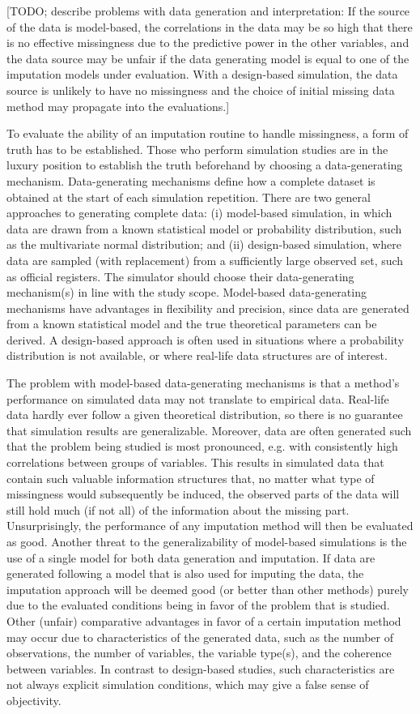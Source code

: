 \documentclass[bimj,fleqn]{w-art}
\begin{document}
[TODO; describe problems with data generation and interpretation: If the source of the data is model-based, the correlations in the data may be so high that there is no effective missingness due to the predictive power in the other variables, and the data source may be unfair if the data generating model is equal to one of the imputation models under evaluation. With a design-based simulation, the data source is unlikely to have no missingness and the choice of initial missing data method may propagate into the evaluations.]

To evaluate the ability of an imputation routine to handle missingness, a form of truth has to be established. Those who perform simulation studies are in the luxury position to establish the truth beforehand by choosing a data-generating mechanism. Data-generating mechanisms define how a complete dataset is obtained at the start of each simulation repetition. There are two general approaches to generating complete data: (i) model-based simulation, in which data are drawn from a known statistical model or probability distribution, such as the multivariate normal distribution; and (ii) design-based simulation, where data are sampled (with replacement) from a sufficiently large observed set, such as official registers. The simulator should choose their data-generating mechanism(s) in line with the study scope. Model-based data-generating mechanisms have advantages in flexibility and precision, since data are generated from a known statistical model and the true theoretical parameters can be derived. A design-based approach is often used in situations where a probability distribution is not available, or where real-life data structures are of interest.

The problem with model-based data-generating mechanisms is that a method's performance on simulated data may not translate to empirical data. Real-life data hardly ever follow a given theoretical distribution, so there is no guarantee that simulation results are generalizable. Moreover, data are often generated such that the problem being studied is most pronounced, e.g. with consistently high correlations between groups of variables. This results in simulated data that contain such valuable information structures that, no matter what type of missingness would subsequently be induced, the observed parts of the data will still hold much (if not all) of the information about the missing part. Unsurprisingly, the performance of any imputation method will then be evaluated as good. Another threat to the generalizability of model-based simulations is the use of a single model for both data generation and imputation. If data are generated following a model that is also used for imputing the data, the imputation approach will be deemed good (or better than other methods) purely due to the evaluated conditions being in favor of the problem that is studied. Other (unfair) comparative advantages in favor of a certain imputation method may occur due to characteristics of the generated data, such as the number of observations, the number of variables, the variable type(s), and the coherence between variables. In contrast to design-based studies, such characteristics are not always explicit simulation conditions, which may give a false sense of objectivity.
\end{document}

